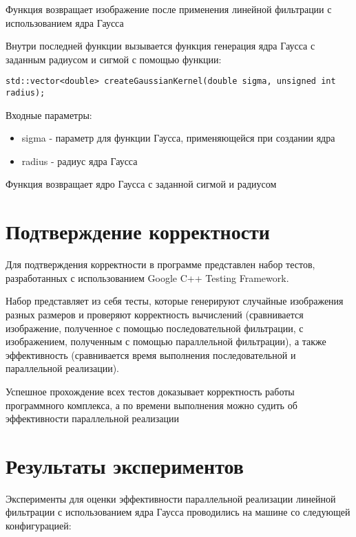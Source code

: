 \documentclass{report}
\begin{document}
\par Функция возвращает изображение после применения линейной фильтрации с использованием ядра Гаусса

\par Внутри последней функции вызывается функция генерация ядра Гаусса с заданным радиусом и сигмой с помощью функции:

\begin{lstlisting}
std::vector<double> createGaussianKernel(double sigma, unsigned int radius);
\end{lstlisting}
\par Входные параметры:
\begin{itemize}
\item sigma - параметр для функции Гаусса, применяющейся при создании ядра
\item radius - радиус ядра Гаусса
\end{itemize}

\par Функция возвращает ядро Гаусса с заданной сигмой и радиусом

\newpage

\section*{Подтверждение корректности}
Для подтверждения корректности в программе представлен набор тестов, разработанных с использованием Google C++ Testing Framework.
\par Набор представляет из себя тесты, которые генерируют случайные изображения разных размеров и проверяют корректность вычислений (сравнивается изображение, полученное с помощью последовательной фильтрации, с изображением, полученным с помощью параллельной фильтрации), а также эффективность (сравнивается время выполнения последовательной и параллельной реализации).
\par Успешное прохождение всех тестов доказывает корректность работы программного комплекса, а по времени выполнения можно судить об эффективности параллельной реализации
\newpage

\section*{Результаты экспериментов}
Эксперименты для оценки эффективности параллельной реализации линейной фильтрации с использованием ядра Гаусса проводились на машине со следующей конфигурацией:
\end{document}
